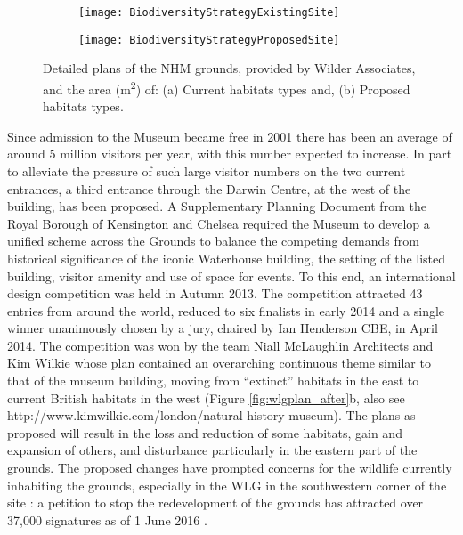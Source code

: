 \begin{figure}
	\centering

	\begin{subfigure}[t]{0.45\textwidth}
		\centering
		\texttt{[image: BiodiversityStrategyExistingSite]}
       		 \caption{}\label{fig:fig_a}
	\end{subfigure}
%
	\begin{subfigure}[t]{0.45\textwidth}
		\centering
		\texttt{[image: BiodiversityStrategyProposedSite]}
		\caption{}\label{fig:fig_b}
	\end{subfigure}
	\caption{Detailed plans of the NHM grounds, provided by Wilder Associates, and the area (m\textsuperscript{2}) of: (a) Current habitats types and, (b) Proposed habitats types.}
\end{figure}

Since admission to the Museum became free in 2001 there has been an average of around 5 million visitors per year, with this number expected to increase. In part to alleviate the pressure of such large visitor numbers on the two current entrances, a third entrance through the Darwin Centre, at the west of the building, has been proposed. A Supplementary Planning Document from the Royal Borough of Kensington and Chelsea \citep{rbkc:2012} required the Museum to develop a unified scheme across the Grounds to balance the competing demands from historical significance of the iconic Waterhouse building, the setting of the listed building, visitor amenity and use of space for events. To this end, an international design competition was held in Autumn 2013. The competition attracted 43 entries from around the world, reduced to six finalists in early 2014 and a single winner unanimously chosen by a jury, chaired by Ian Henderson CBE, in April 2014. The competition was won by the team Niall McLaughlin Architects and Kim Wilkie whose plan contained an overarching continuous theme similar to that of the museum building, moving from ``extinct'' habitats in the east to current British habitats in the west (Figure \ref{fig:wlgplan_after}b, also see http://www.kimwilkie.com/london/natural-history-museum). The plans as proposed will result in the loss and reduction of some habitats, gain and expansion of others, and disturbance particularly in the eastern part of the grounds. The proposed changes have prompted concerns for the wildlife currently inhabiting the grounds, especially in the WLG in the southwestern corner of the site \citep{prospect:2015wg,guardian:2015wg,avery:2015wg,telegraph:2015wg,dailymail:2015wg}: a petition to stop the redevelopment of the grounds has attracted over 37,000 signatures as of 1 June 2016 \citep{changepetition:2015wg}.  

